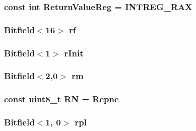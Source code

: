 \label{namespaceX86ISA_a99ba4a35fbf9debeb1f7ddb1db7b9967}
\hypertarget{namespaceX86ISA_a472eedbcba9726645062b921f8d07e98}{
\subsubsection[{ReturnValueReg}]{\setlength{\rightskip}{0pt plus 5cm}const int {\bf ReturnValueReg} = INTREG\_\-RAX}}
\label{namespaceX86ISA_a472eedbcba9726645062b921f8d07e98}
\hypertarget{namespaceX86ISA_ab4cc110bfe2eb87b81723e8bbf2fc328}{
\subsubsection[{rf}]{\setlength{\rightskip}{0pt plus 5cm}Bitfield$<$16$>$ {\bf rf}}}
\label{namespaceX86ISA_ab4cc110bfe2eb87b81723e8bbf2fc328}
\hypertarget{namespaceX86ISA_a3ce01f7fc7a28e6304ff8ca26d42a986}{
\subsubsection[{rInit}]{\setlength{\rightskip}{0pt plus 5cm}Bitfield$<$1$>$ {\bf rInit}}}
\label{namespaceX86ISA_a3ce01f7fc7a28e6304ff8ca26d42a986}
\hypertarget{namespaceX86ISA_a7244bd0e5dc7ef7a4db0febe6e585746}{
\subsubsection[{rm}]{\setlength{\rightskip}{0pt plus 5cm}Bitfield$<$2,0$>$ {\bf rm}}}
\label{namespaceX86ISA_a7244bd0e5dc7ef7a4db0febe6e585746}
\hypertarget{namespaceX86ISA_a66e737c817580b498d2ad105c801a744}{
\subsubsection[{RN}]{\setlength{\rightskip}{0pt plus 5cm}const uint8\_\-t {\bf RN} = Repne}}
\label{namespaceX86ISA_a66e737c817580b498d2ad105c801a744}
\hypertarget{namespaceX86ISA_a9a887e24000290243c61c6b57c31f4f6}{
\subsubsection[{rpl}]{\setlength{\rightskip}{0pt plus 5cm}Bitfield$<$1, 0$>$ {\bf rpl}}}
